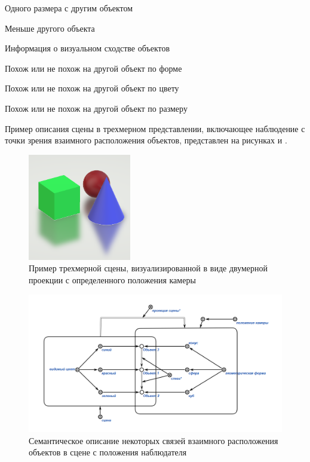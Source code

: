 \begin{textitemize}
\begin{textitemize}
        \item Одного размера с другим объектом
        \item Меньше другого объекта
    \end{textitemize}
    \item Информация о визуальном сходстве объектов
    \begin{textitemize}
        \item Похож или не похож на другой объект по форме
        \item Похож или не похож на другой объект по цвету
        \item Похож или не похож на другой объект по размеру
    \end{textitemize}
\end{textitemize}


Пример описания сцены в трехмерном представлении, включающее наблюдение с точки зрения взаимного расположения объектов, представлен на рисунках \textit{} и \textit{}.

\begin{figure}[H]
    \includegraphics[scale=0.8, width=0.4\textwidth]{author/part4/figures/scene-example.png}
    \caption{Пример трехмерной сцены, визуализированной в виде двумерной проекции с определенного положения камеры}
    \label{fig:scene-example}
\end{figure}

\begin{figure}[H]
    \includegraphics[scale=0.8, width=1.0\textwidth]{author/part4/figures/scene-description.png}
    \caption{Семантическое описание некоторых связей взаимного расположения объектов в сцене с положения наблюдателя}
    \label{fig:scene-description}
\end{figure}


